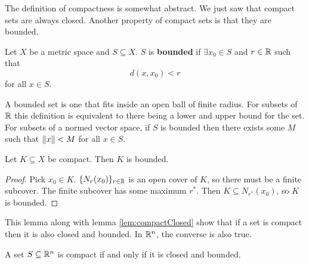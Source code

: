 The definition of compactness is somewhat abstract. We just saw that
compact sets are always closed. Another property of compact sets is
that they are bounded. 
\begin{definition}
  Let $X$ be a metric space and $S \subseteq X$. $S$ is
  \textbf{bounded} if $\exists x_0 \in S$ and $r \in \mathbb{R}$ such that 
  \[ d(x,x_0) < r \]
  for all $x \in S$.
\end{definition}
A bounded set is one that fits inside an open ball of finite
radius. For subsets of $\mathbb{R}$ this definition is equivalent to there
being a lower and upper bound for the set. For subsets of a normed
vector space, if $S$ is bounded then there exists some $M$ such that
$\left\Vert {x} \right\Vert < M$ for all $x \in S$. 
\begin{lemma}
  Let $K \subseteq X$ be compact. Then $K$ is bounded. 
\end{lemma}
\begin{proof}
  Pick $x_0 \in K$. $\{N_{r}(x_0) \}_{r \in \mathbb{R}}$ is an open cover of
  $K$, so there must be a finite subcover. The finite subcover has
  some maximum $r^*$. Then $K \subseteq N_{r^*}(x_0)$, so $K$ is bounded.
\end{proof}
This lemma along with lemma \ref{lem:compactClosed} show that if a set
is compact then it is also closed and bounded. In $\mathbb{R}^n$, the converse
is also true.
\begin{theorem}\label{thm:hb}
  A set $S \subseteq \mathbb{R}^n$ is compact if and only if it is closed and
  bounded. 
\end{theorem}
